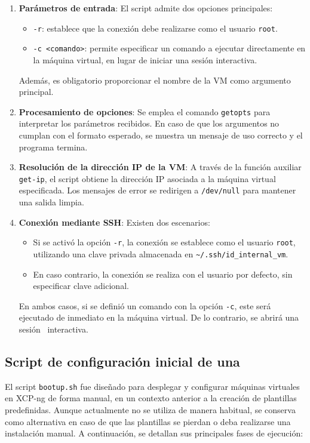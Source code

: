 \begin{enumerate}
    \item \textbf{Parámetros de entrada}:  
    El script admite dos opciones principales:
    \begin{itemize}
        \item \texttt{-r}: establece que la conexión debe realizarse como el usuario \texttt{root}.
        \item \texttt{-c <comando>}: permite especificar un comando a ejecutar directamente en la máquina virtual, en lugar de iniciar una sesión interactiva.
    \end{itemize}
    Además, es obligatorio proporcionar el nombre de la VM como argumento principal.

    \item \textbf{Procesamiento de opciones}:  
    Se emplea el comando \texttt{getopts} para interpretar los parámetros recibidos. En caso de que los argumentos no cumplan con el formato esperado, se muestra un mensaje de uso correcto y el programa termina.

    \item \textbf{Resolución de la dirección IP de la VM}:  
    A través de la función auxiliar \texttt{get-ip}, el script obtiene la dirección IP asociada a la máquina virtual especificada. Los mensajes de error se redirigen a \texttt{/dev/null} para mantener una salida limpia.

    \item \textbf{Conexión mediante SSH}:  
    Existen dos escenarios:
    \begin{itemize}
        \item Si se activó la opción \texttt{-r}, la conexión se establece como el usuario \texttt{root}, utilizando una clave privada almacenada en \texttt{\~{}/.ssh/id\_internal\_vm}.
        \item En caso contrario, la conexión se realiza con el usuario por defecto, sin especificar clave adicional.
    \end{itemize}
    En ambos casos, si se definió un comando con la opción \texttt{-c}, este será ejecutado de inmediato en la máquina virtual. De lo contrario, se abrirá una sesión \SSH\ interactiva.

\end{enumerate}



\subsection{Script de configuración inicial de una \VM}
\noindent
El script \texttt{bootup.sh} fue diseñado para desplegar y configurar máquinas virtuales en XCP-ng de forma manual, en un contexto anterior a la creación de plantillas predefinidas. Aunque actualmente no se utiliza de manera habitual, se conserva como alternativa en caso de que las plantillas se pierdan o deba realizarse una instalación manual. A continuación, se detallan sus principales fases de ejecución:

